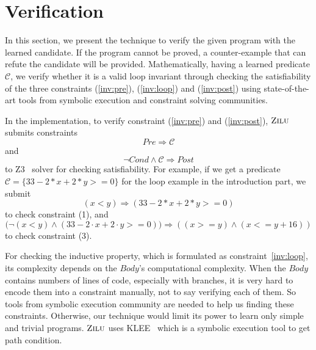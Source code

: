 
\section{Verification} %
\label{sec:verification}
In this section, we present the technique to verify the given program with the learned candidate.
If the program cannot be proved, a counter-example that can refute the candidate will be provided.
Mathematically, having a learned predicate $\mathcal{C}$, we verify whether it is a valid loop invariant through
checking the satisfiability of the three constraints (\ref{inv:pre}), (\ref{inv:loop}) and (\ref{inv:post}) 
using state-of-the-art tools from symbolic execution and constraint solving communities.

In the implementation, to verify constraint (\ref{inv:pre}) and (\ref{inv:post}), 
$\textsc{Zilu}$ submits constraints 
$$Pre \Rightarrow \mathcal{C}$$ 
and 
$$\neg {Cond} \wedge \mathcal{C} \Rightarrow Post$$
to Z3~\cite{de2008z3} solver for checking satisfiability.
For example, if we get a predicate $\mathcal{C} = \{33-2*x+2*y>=0\}$
for the loop example in the introduction part, 
we submit 
$$(x<y) \Rightarrow (33-2*x+2*y>=0)$$
to check constraint (1), and 
$$\big(\neg(x<y) \wedge (33-2\cdot x+2\cdot y>=0)\big) \Rightarrow ((x >= y) \wedge (x <= y + 16))$$
to check constraint (3).

For checking the inductive property, which is formulated as constraint~\ref{inv:loop},
its complexity depends on the $Body$'s computational complexity.
When the $Body$ contains numbers of lines of code, especially with branches, 
it is very hard to encode them into a constraint manually,
not to say verifying each of them.
So tools from symbolic execution community are needed to help us finding these constraints.
Otherwise, our technique would limit its power to learn only simple and trivial programs. 
$\textsc{Zilu}$ uses KLEE~\cite{cadar2008klee} which is a symbolic execution tool to get path condition.


